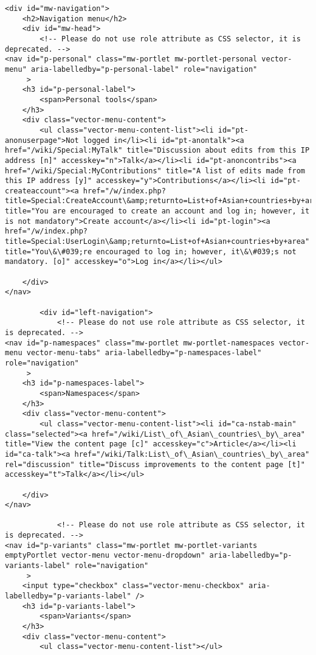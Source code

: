 \documentclass[11pt]{article}
\begin{document}
\begin{Verbatim}[commandchars=\\\{\}]
<div id="mw-navigation">
	<h2>Navigation menu</h2>
	<div id="mw-head">
		<!-- Please do not use role attribute as CSS selector, it is deprecated. -->
<nav id="p-personal" class="mw-portlet mw-portlet-personal vector-menu" aria-labelledby="p-personal-label" role="navigation" 
	 >
	<h3 id="p-personal-label">
		<span>Personal tools</span>
	</h3>
	<div class="vector-menu-content">
		<ul class="vector-menu-content-list"><li id="pt-anonuserpage">Not logged in</li><li id="pt-anontalk"><a href="/wiki/Special:MyTalk" title="Discussion about edits from this IP address [n]" accesskey="n">Talk</a></li><li id="pt-anoncontribs"><a href="/wiki/Special:MyContributions" title="A list of edits made from this IP address [y]" accesskey="y">Contributions</a></li><li id="pt-createaccount"><a href="/w/index.php?title=Special:CreateAccount\&amp;returnto=List+of+Asian+countries+by+area" title="You are encouraged to create an account and log in; however, it is not mandatory">Create account</a></li><li id="pt-login"><a href="/w/index.php?title=Special:UserLogin\&amp;returnto=List+of+Asian+countries+by+area" title="You\&\#039;re encouraged to log in; however, it\&\#039;s not mandatory. [o]" accesskey="o">Log in</a></li></ul>
		
	</div>
</nav>

		<div id="left-navigation">
			<!-- Please do not use role attribute as CSS selector, it is deprecated. -->
<nav id="p-namespaces" class="mw-portlet mw-portlet-namespaces vector-menu vector-menu-tabs" aria-labelledby="p-namespaces-label" role="navigation" 
	 >
	<h3 id="p-namespaces-label">
		<span>Namespaces</span>
	</h3>
	<div class="vector-menu-content">
		<ul class="vector-menu-content-list"><li id="ca-nstab-main" class="selected"><a href="/wiki/List\_of\_Asian\_countries\_by\_area" title="View the content page [c]" accesskey="c">Article</a></li><li id="ca-talk"><a href="/wiki/Talk:List\_of\_Asian\_countries\_by\_area" rel="discussion" title="Discuss improvements to the content page [t]" accesskey="t">Talk</a></li></ul>
		
	</div>
</nav>

			<!-- Please do not use role attribute as CSS selector, it is deprecated. -->
<nav id="p-variants" class="mw-portlet mw-portlet-variants emptyPortlet vector-menu vector-menu-dropdown" aria-labelledby="p-variants-label" role="navigation" 
	 >
	<input type="checkbox" class="vector-menu-checkbox" aria-labelledby="p-variants-label" />
	<h3 id="p-variants-label">
		<span>Variants</span>
	</h3>
	<div class="vector-menu-content">
		<ul class="vector-menu-content-list"></ul>
		

\end{Verbatim}
\end{document}
